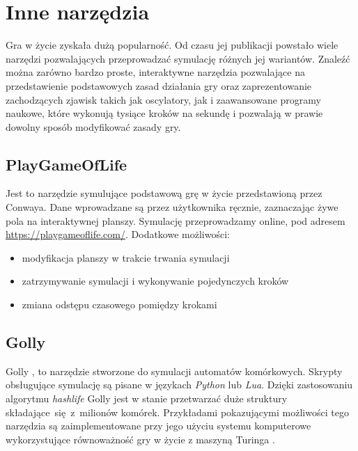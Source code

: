 \documentclass[declaration,shortabstract, inz]{iithesis}
\theoremstyle{definition} \newtheorem{definition}{Definicja}[]
\theoremstyle{plain} \newtheorem{remark}[definition]{Obserwacja}
\theoremstyle{plain} \newtheorem{theorem}[definition]{Twierdzenie}
\theoremstyle{plain} \newtheorem{example}{Przykład}[definition]
\theoremstyle{plain} \newtheorem{lemma}[definition]{Lemat}
\begin{document}
\chapter{Inne narzędzia}
\label{sec:tools}
Gra w życie zyskała dużą popularność. Od czasu jej publikacji powstało wiele narzędzi pozwalających przeprowadzać symulację różnych jej wariantów. Znaleźć można zarówno bardzo proste, interaktywne narzędzia pozwalające na przedstawienie podstawowych zasad działania gry oraz zaprezentowanie zachodzących zjawisk takich jak oscylatory, jak i zaawansowane programy naukowe, które wykonują tysiące kroków na sekundę i pozwalają w prawie dowolny sposób modyfikować zasady gry.
\section{PlayGameOfLife}
Jest to narzędzie symulujące podstawową grę w życie przedstawioną przez Conwaya. Dane wprowadzane są przez użytkownika ręcznie, zaznaczając żywe pola na interaktywnej planszy. Symulację przeprowadzamy online, pod adresem \url{https://playgameoflife.com/}. Dodatkowe możliwości:
\begin{itemize}
\item modyfikacja planszy w trakcie trwania symulacji
\item zatrzymywanie symulacji i wykonywanie pojedynczych kroków
\item zmiana odstępu czasowego pomiędzy krokami
\end{itemize}

\section{Golly}
Golly \cite{golly}, to narzędzie stworzone do symulacji automatów komórkowych. Skrypty obsługujące symulację są pisane w językach \textit{Python} lub \textit{Lua}. Dzięki zastosowaniu algorytmu \textit{hashlife} \cite{hashlife} Golly jest w stanie przetwarzać duże struktury składające~się~z~milionów komórek. Przykładami pokazującymi możliwości tego narzędzia są zaimplementowane przy jego użyciu systemu komputerowe wykorzystujące równoważność gry w życie z maszyną Turinga \cite{rendell}.
\end{document}
